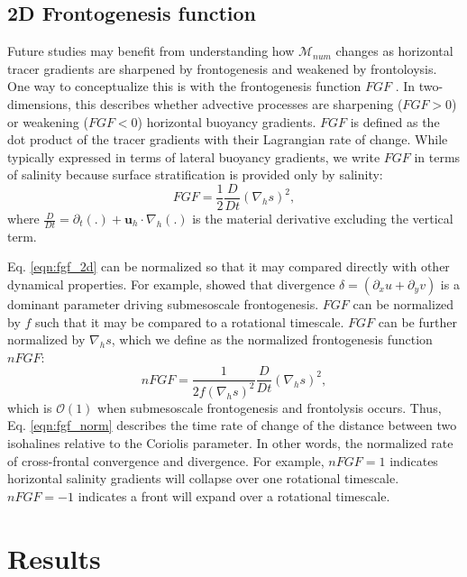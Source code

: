 \subsection{2D Frontogenesis function}
Future studies may benefit from understanding how $\mathcal{M}_{num}$ changes as horizontal tracer gradients are sharpened by frontogenesis and weakened by frontoloysis. One way to conceptualize this is with the frontogenesis function $FGF$ \citep{hoskins1982mathematical, mcwilliams2021oceanic}. In two-dimensions, this describes whether advective processes are sharpening ($FGF>0$) or weakening ($FGF<0$) horizontal buoyancy gradients. $FGF$ is defined as the dot product of the tracer gradients with their Lagrangian rate of change. While typically expressed in terms of lateral buoyancy gradients, we write $FGF$ in terms of salinity because surface stratification is provided only by salinity:
\begin{equation} \label{eqn:fgf_2d}
        FGF = \frac{1}{2}\frac{D}{Dt} \left(\nabla_h s \right)^2,
\end{equation}
where $\frac{D}{Dt} = \partial_t(.) + \mathbf{u}_h \cdot \nabla_h (.)$ is the material derivative excluding the vertical term. 

Eq. \ref{eqn:fgf_2d} can be normalized so that it may compared directly with other dynamical properties. For example, \citet{barkan2019role} showed that divergence $\delta  = (\partial_x u + \partial_y v)$ is a dominant parameter driving submesoscale frontogenesis. $FGF$ can be normalized by $f$ such that it may be compared to a rotational timescale. $FGF$ can be further normalized by $\nabla_h s$, which we define as the normalized frontogenesis function $nFGF$:
\begin{equation} \label{eqn:fgf_norm}
    nFGF = \frac{1}{2f \left(\nabla_h s \right)^2}\frac{D}{Dt} \left(\nabla_h s \right)^2,
\end{equation}
which is $\mathcal{O}(1)$ when submesoscale frontogenesis and frontolysis occurs. Thus, Eq. \ref{eqn:fgf_norm} describes the time rate of change of the distance between two isohalines relative to the Coriolis parameter. In other words, the normalized rate of cross-frontal convergence and divergence. For example, $nFGF=1$ indicates horizontal salinity gradients will collapse over one rotational timescale. $nFGF = -1$ indicates a front will expand over a rotational timescale. 

\section{Results} \label{sec:results}
